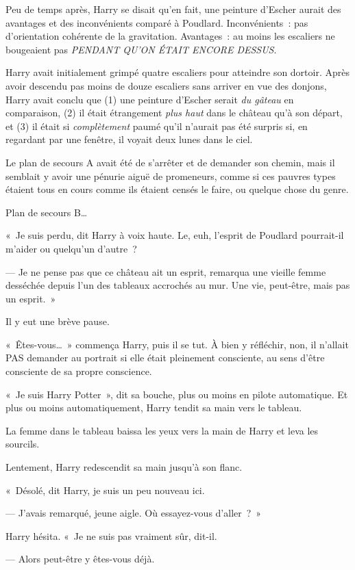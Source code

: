 Peu de temps après, Harry se disait qu'en fait, une peinture d'Escher aurait des avantages et des inconvénients comparé à Poudlard.
Inconvénients~: pas d'orientation cohérente de la gravitation.
Avantages~: au moins les escaliers ne bougeaient pas \emph{PENDANT QU'ON ÉTAIT ENCORE DESSUS}.

Harry avait initialement grimpé quatre escaliers pour atteindre son dortoir.
Après avoir descendu pas moins de douze escaliers sans arriver en vue des donjons, Harry avait conclu que (1) une peinture d'Escher serait \emph{du gâteau} en comparaison, (2) il était étrangement \emph{plus haut} dans le château qu'à son départ, et (3) il était si \emph{complètement} paumé qu'il n'aurait pas été surpris si, en regardant par une fenêtre, il voyait deux lunes dans le ciel.


Le plan de secours A avait été de s'arrêter et de demander son chemin, mais il semblait y avoir une pénurie aiguë de promeneurs, comme si ces pauvres types étaient tous en cours comme ils étaient censés le faire, ou quelque chose du genre.

Plan de secours B…

«~Je suis perdu, dit Harry à voix haute. Le, euh, l'esprit de Poudlard pourrait-il m'aider ou quelqu'un d'autre~?

--- Je ne pense pas que ce château ait un esprit, remarqua une vieille femme desséchée depuis l'un des tableaux accrochés au mur. Une vie, peut-être, mais pas un esprit.~»

Il y eut une brève pause.

«~Êtes-vous…~» commença Harry, puis il se tut.
À bien y réfléchir, non, il n'allait PAS demander au portrait si elle était pleinement consciente, au sens d'être consciente de sa propre conscience.

«~Je suis Harry Potter~», dit sa bouche, plus ou moins en pilote automatique.
Et plus ou moins automatiquement, Harry tendit sa main vers le tableau.

La femme dans le tableau baissa les yeux vers la main de Harry et leva les sourcils.

Lentement, Harry redescendit sa main jusqu'à son flanc.

«~Désolé, dit Harry, je suis un peu nouveau ici.

--- J'avais remarqué, jeune aigle. Où essayez-vous d'aller~?~»

Harry hésita. «~Je ne suis pas vraiment sûr, dit-il.

--- Alors peut-être y êtes-vous déjà.

